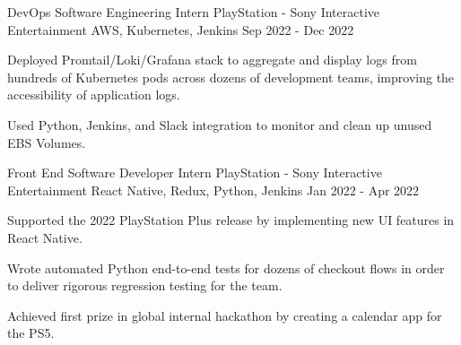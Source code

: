 

\begin{cventries}

  \cventry
    {DevOps Software Engineering Intern} %
    {PlayStation - Sony Interactive Entertainment} %
    {AWS, Kubernetes, Jenkins} %
    {Sep 2022 - Dec 2022} %
    {
      \begin{cvitems} %
        \item {Deployed Promtail/Loki/Grafana stack to aggregate and display logs from hundreds of Kubernetes pods across dozens of development teams, improving the accessibility of application logs.}
        \item {Used Python, Jenkins, and Slack integration to monitor and clean up unused EBS Volumes.}
      \end{cvitems}
    }

  \cventry
    {Front End Software Developer Intern} %
    {PlayStation - Sony Interactive Entertainment} %
    {React Native, Redux, Python, Jenkins} %
    {Jan 2022 - Apr 2022} %
    {
      \begin{cvitems} %
        \item {Supported the 2022 PlayStation Plus release by implementing new UI features in React Native.}
        \item {Wrote automated Python end-to-end tests for dozens of checkout flows in order to deliver rigorous regression testing for the team.} 
        \item {Achieved first prize in global internal hackathon by creating a calendar app for the PS5.}
      \end{cvitems}
    }



\end{cventries}
